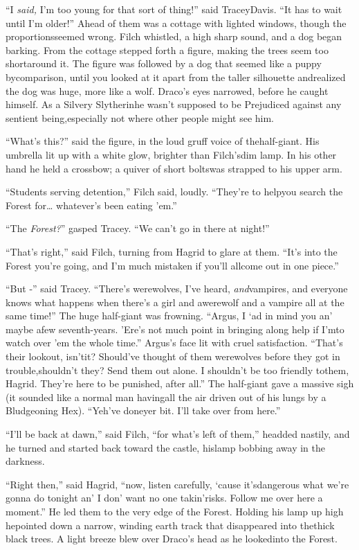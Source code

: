 ``I \emph{said,} I'm too young for that sort of thing!'' said TraceyDavis. ``It has to wait until I'm older!''
Ahead of them was a cottage with lighted windows, though the proportionsseemed wrong.
Filch whistled, a high sharp sound, and a dog began barking.
From the cottage stepped forth a figure, making the trees seem too shortaround it. The figure was followed by a dog that seemed like a puppy bycomparison, until you looked at it apart from the taller silhouette andrealized the dog was huge, more like a wolf.
Draco's eyes narrowed, before he caught himself. As a Silvery Slytherinhe wasn't supposed to be Prejudiced against any sentient being,especially not where other people might see him.

``What's this?'' said the figure, in the loud gruff voice of thehalf-giant. His umbrella lit up with a white glow, brighter than Filch'sdim lamp. In his other hand he held a crossbow; a quiver of short boltswas strapped to his upper arm.

``Students serving detention,'' Filch said, loudly. ``They're to helpyou search the Forest for\ldots{} whatever's been eating 'em.''

``The \emph{Forest?}'' gasped Tracey. ``We can't go in there at night!''

``That's right,'' said Filch, turning from Hagrid to glare at them.
``It's into the Forest you're going, and I'm much mistaken if you'll allcome out in one piece.''

``But -'' said Tracey. ``There's werewolves, I've heard, \emph{and}vampires, and everyone knows what happens when there's a girl and awerewolf and a vampire all at the same time!''
The huge half-giant was frowning. ``Argus, I `ad in mind you an' maybe afew seventh-years. 'Ere's not much point in bringing along help if I'mto watch over 'em the whole time.''
Argus's face lit with cruel satisfaction. ``That's their lookout, isn'tit? Should've thought of them werewolves before they got in trouble,shouldn't they? Send them out alone. I shouldn't be too friendly tothem, Hagrid. They're here to be punished, after all.''
The half-giant gave a massive sigh (it sounded like a normal man havingall the air driven out of his lungs by a Bludgeoning Hex). ``Yeh've doneyer bit. I'll take over from here.''

``I'll be back at dawn,'' said Filch, ``for what's left of them,'' headded nastily, and he turned and started back toward the castle, hislamp bobbing away in the darkness.

``Right then,'' said Hagrid, ``now, listen carefully, `cause it'sdangerous what we're gonna do tonight an' I don' want no one takin'risks. Follow me over here a moment.''
He led them to the very edge of the Forest. Holding his lamp up high hepointed down a narrow, winding earth track that disappeared into thethick black trees. A light breeze blew over Draco's head as he lookedinto the Forest.

